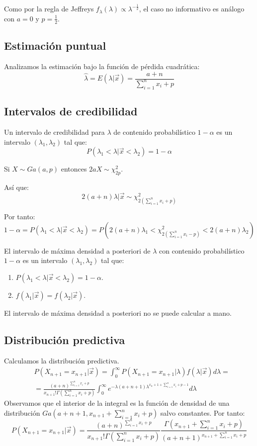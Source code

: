 Como por la regla de Jeffreys $f_\lambda(\lambda) \propto \lambda^{-\frac{1}{2}}$, el caso no informativo es análogo con $a = 0$ y $p = \frac{1}{2}$.

\subsection*{Estimación puntual}
Analizamos la estimación bajo la función de pérdida cuadrática:
$$\hat{\lambda} = E(\lambda|\vec{x}) = \frac{a+n}{\sum_{i=1}^n x_i + p}$$

\subsection*{Intervalos de credibilidad}
Un intervalo de credibilidad para $\lambda$ de contenido probabilístico $1-\alpha$ es un intervalo $(\lambda_1, \lambda_2)$ tal que:
$$P(\lambda_1 < \lambda|\vec{x} < \lambda_2) = 1-\alpha$$

\begin{note}
    Si $X \sim Ga(a, p)$ entonces $2aX \sim \chi^2_{2p}$.
\end{note}

Así que:
$$2(a+n)\lambda|\vec{x} \sim \chi^2_{2(\sum_{i=1}^n x_i + p)}$$

Por tanto:
$$1-\alpha = P(\lambda_1 < \lambda|\vec{x} < \lambda_2) = P(2(a+n)\lambda_1 < \chi^2_{2(\sum_{i=1}^n x_i - p)} < 2(a+n)\lambda_2)$$

El intervalo de máxima densidad a posteriori de $\lambda$ con contenido probabilístico $1-\alpha$ es un intervalo $(\lambda_1, \lambda_2)$ tal que:
\begin{enumerate}
    \item $P(\lambda_1 < \lambda|\vec{x} < \lambda_2) = 1-\alpha$.
    \item $f(\lambda_1|\vec{x}) = f(\lambda_2|\vec{x})$.
\end{enumerate}

\begin{note}
    El intervalo de máxima densidad a posteriori no se puede calcular a mano.
\end{note}

\subsection*{Distribución predictiva}
Calculamos la distribución predictiva.
\begin{align*}
     & P(X_{n+1} = x_{n+1}|\vec{x}) = \int_0^\infty P(X_{n+1} = x_{n+1}|\lambda)f(\lambda|\vec{x})d\lambda =                                                         \\
     & = \frac{(a+n)^{\sum_{i=1}^n x_i + p}}{x_{n+1}!\Gamma(\sum_{i=1}^n x_i + p)} \int_0^\infty e^{-\lambda(a+n+1)\lambda^{x_n+1 + \sum_{i=1}^n x_i + p-1}}d\lambda
\end{align*}
Observamos que el interior de la integral es la función de densidad de una distribución $Ga(a+n+1, x_{n+1} + \sum_{i=1}^n x_i + p)$ salvo constantes.
Por tanto:
$$P(X_{n+1} = x_{n+1}|\vec{x}) = \frac{(a+n)^{\sum_{i=1}^n x_i + p}}{x_{n+1}!\Gamma(\sum_{i=1}^n x_i + p)} \frac{\Gamma(x_{n+1} + \sum_{i=1}^n x_i + p)}{(a+n+1)^{x_{n+1} + \sum_{i=1}^n x_i + p}}$$

